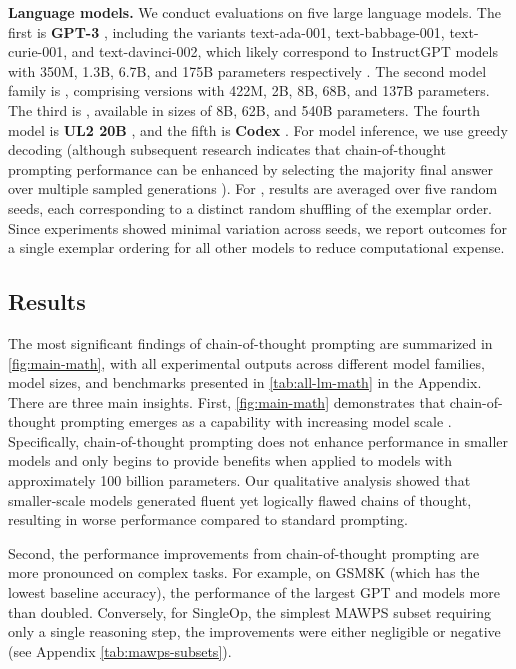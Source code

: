 \textbf{Language models.} We conduct evaluations on five large language models. The first is \textbf{GPT-3} \citep{brown2020language}, including the variants text-ada-001, text-babbage-001, text-curie-001, and text-davinci-002, which likely correspond to InstructGPT models with 350M, 1.3B, 6.7B, and 175B parameters respectively \citep{ouyang2022training}. The second model family is \textbf{\lamda{}} \citep{thoppilan2022lamda}, comprising versions with 422M, 2B, 8B, 68B, and 137B parameters. The third is \textbf{\palm{}}, available in sizes of 8B, 62B, and 540B parameters. The fourth model is \textbf{UL2 20B} \citep{tay2022unifying}, and the fifth is \textbf{Codex} \citep[][code-davinci-002 within the OpenAI API]{chen2021evaluating}. For model inference, we use greedy decoding (although subsequent research indicates that chain-of-thought prompting performance can be enhanced by selecting the majority final answer over multiple sampled generations \citep{wang2022self}). For \lamda{}, results are averaged over five random seeds, each corresponding to a distinct random shuffling of the exemplar order. Since \lamda{} experiments showed minimal variation across seeds, we report outcomes for a single exemplar ordering for all other models to reduce computational expense.

\subsection{Results}
The most significant findings of chain-of-thought prompting are summarized in \cref{fig:main-math}, with all experimental outputs across different model families, model sizes, and benchmarks presented in \cref{tab:all-lm-math} in the Appendix. There are three main insights. First, \cref{fig:main-math} demonstrates that chain-of-thought prompting emerges as a capability with increasing model scale \citep{wei2022emergent}. Specifically, chain-of-thought prompting does not enhance performance in smaller models and only begins to provide benefits when applied to models with approximately 100 billion parameters. Our qualitative analysis showed that smaller-scale models generated fluent yet logically flawed chains of thought, resulting in worse performance compared to standard prompting.


Second, the performance improvements from chain-of-thought prompting are more pronounced on complex tasks. For example, on GSM8K (which has the lowest baseline accuracy), the performance of the largest GPT and \palm{} models more than doubled. Conversely, for SingleOp, the simplest MAWPS subset requiring only a single reasoning step, the improvements were either negligible or negative (see Appendix \cref{tab:mawps-subsets}).

